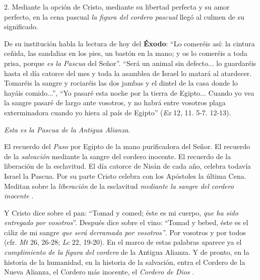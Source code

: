 			\begin{body}2. Mediante la opción de Cristo, mediante su libertad perfecta y su amor perfecto, en la cena pascual \textit{la figura del cordero pascual} llegó al culmen de su significado. \end{body}
			
			\begin{body}De su institución habla la lectura de hoy del \textbf{Éxodo}: “Lo comeréis así: la cintura ceñida, las sandalias en los pies, un bastón en la mano; y os lo comeréis a toda prisa, porque \textit{es la Pascua} del Señor”. “Será un animal sin defecto... lo guardaréis hasta el día catorce del mes y toda la asamblea de Israel lo matará al atardecer. Tomaréis la sangre y rociaréis las dos jambas y el dintel de la casa donde lo hayáis comido...”, “Yo pasaré esta noche por la tierra de Egipto... Cuando yo vea la sangre pasaré de largo ante vosotros, y no habrá entre vosotros plaga exterminadora cuando yo hiera al país de Egipto” (\textit{Ex} 12, 11. 5-7. 12-13). \end{body}
			
			\begin{body}\textit{Esta es la Pascua de la Antigua Alianza.}\end{body}
			
			\begin{body}El recuerdo del \textit{Paso} por Egipto de la mano purificadora del Señor. El recuerdo de la \textit{salvación} mediante la sangre del cordero inocente. El recuerdo de la liberación de la esclavitud. El día catorce de Nisán de cada año, celebra todavía Israel la Pascua. Por su parte Cristo celebra con los Apóstoles la última Cena. Meditan sobre la \textit{liberación} de la esclavitud \textit{mediante la sangre del cordero inocente} . \end{body}
			
			\begin{body}Y Cristo dice sobre el pan: “Tomad y comed; éste es mi cuerpo, \textit{que ha sido entregado por vosotros}”. Después dice sobre el vino: “Tomad y bebed, éste es el cáliz de mi sangre \textit{que será derramada por vosotros”}. Por vosotros y por todos (cfr. \textit{Mt} 26, 26-28; \textit{Lc} 22, 19-20). En el marco de estas palabras aparece ya el \textit{cumplimiento de la figura del cordero} de la Antigua Alianza. Y de pronto, en la historia de la humanidad, en la historia de la salvación, entra el Cordero de la Nueva Alianza, el Cordero más inocente, el \textit{Cordero de Dios} . \end{body}
			
